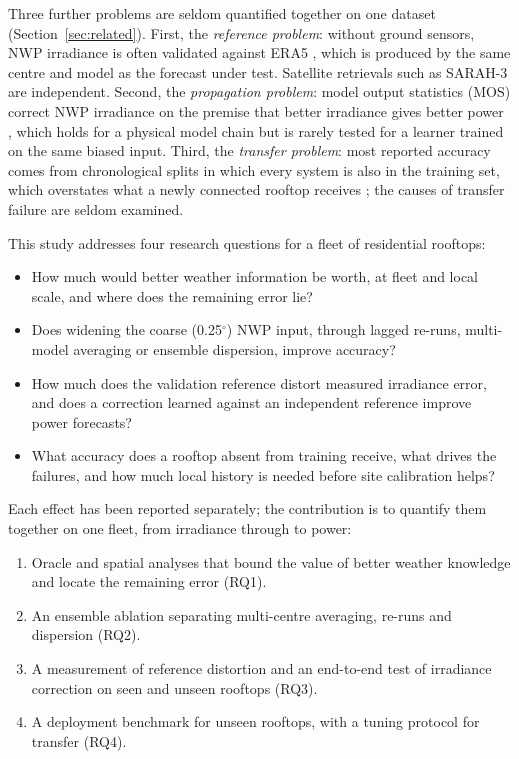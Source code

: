 Three further problems are seldom quantified together on one dataset (Section~\ref{sec:related}). First, the \emph{reference problem}: without ground sensors, NWP irradiance is often validated against ERA5 \citep{Hersbach2020}, which is produced by the same centre and model as the forecast under test. Satellite retrievals such as SARAH-3 \citep{Pfeifroth2024} are independent. Second, the \emph{propagation problem}: model output statistics (MOS) correct NWP irradiance on the premise that better irradiance gives better power \citep{Verzijlbergh2015}, which holds for a physical model chain \citep{Mayer2021,Mayer2022} but is rarely tested for a learner trained on the same biased input. Third, the \emph{transfer problem}: most reported accuracy comes from chronological splits in which every system is also in the training set, which overstates what a newly connected rooftop receives \citep{Depoortere2025}; the causes of transfer failure are seldom examined.

This study addresses four research questions for a fleet of residential rooftops:
\begin{itemize}
\item[RQ1.] How much would better weather information be worth, at fleet and local scale, and where does the remaining error lie?
\item[RQ2.] Does widening the coarse (0.25$^\circ$) NWP input, through lagged re-runs, multi-model averaging or ensemble dispersion, improve accuracy?
\item[RQ3.] How much does the validation reference distort measured irradiance error, and does a correction learned against an independent reference improve power forecasts?
\item[RQ4.] What accuracy does a rooftop absent from training receive, what drives the failures, and how much local history is needed before site calibration helps?
\end{itemize}

Each effect has been reported separately; the contribution is to quantify them together on one fleet, from irradiance through to power:
\begin{enumerate}
\item Oracle and spatial analyses that bound the value of better weather knowledge and locate the remaining error (RQ1).
\item An ensemble ablation separating multi-centre averaging, re-runs and dispersion (RQ2).
\item A measurement of reference distortion and an end-to-end test of irradiance correction on seen and unseen rooftops (RQ3).
\item A deployment benchmark for unseen rooftops, with a tuning protocol for transfer (RQ4).
\end{enumerate}
